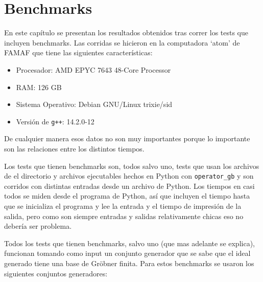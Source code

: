 \documentclass[12pt]{report}
\theoremstyle{customstyle}
\theoremstyle{factstyle}
\begin{document}
\chapter{Benchmarks}\label{cap:Benchmarks}

En este capítulo se presentan los resultados obtenidos tras correr los tests que incluyen benchmarks. Las corridas se hicieron en la computadora `atom' de FAMAF que tiene las siguientes características:

\begin{itemize}
  \item Procesador: AMD EPYC 7643 48-Core Processor
  \item RAM: 126 GB
  \item Sistema Operativo: Debian GNU/Linux trixie/sid
  \item Versión de \texttt{g++}: 14.2.0-12
\end{itemize}

De cualquier manera esos datos no son muy importantes porque lo importante son las relaciones entre los distintos tiempos.

Los tests que tienen benchmarks son, todos salvo uno, tests que usan los archivos de el directorio  y archivos ejecutables hechos en Python con \texttt{operator\_gb} y son corridos con distintas entradas desde un archivo de Python. Los tiempos en casi todos se miden desde el programa de Python, así que incluyen el tiempo hasta que se inicializa el programa y lee la entrada y el tiempo de impresión de la salida, pero como son siempre entradas y salidas relativamente chicas eso no debería ser problema.

Todos los tests que tienen benchmarks, salvo uno (que mas adelante se explica), funcionan tomando como input un conjunto generador que se sabe que el ideal generado tiene una base de Gröbner finita. Para estos benchmarks se usaron los siguientes conjuntos generadores:
\end{document}
